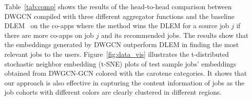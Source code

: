 \documentclass[manuscript,screen,review]{acmart}
\begin{document}
Table~\ref{tab:comp} shows the results of the head-to-head comparison between DWGCN compiled with three different aggregator functions and the baseline DLEM~\cite{zhao:2021embedding} on the co-apps where the method wins the DLEM for a source job $j$ if there are more co-apps on job $j$ and its recommended jobs. The results show that the embeddings generated by DWGCN outperform DLEM in finding the most relevant jobs to the users. Figure~\ref{fig:data_vis} illustrates the t-distributed stochastic neighbor embedding (t-SNE) plots of test sample jobs’ embeddings obtained from DWGCN-GCN colored with the carotene categories. It shows that our approach is also effective in capturing the 
content information of jobs as the job cohorts with different colors are clearly clustered in different regions. 

\end{document}
